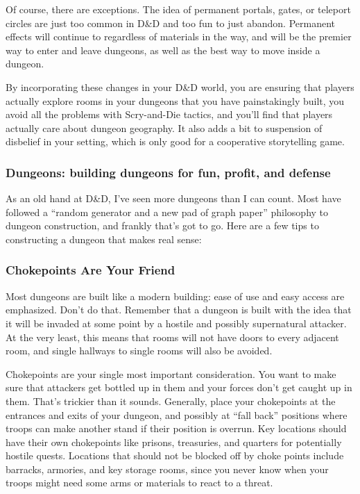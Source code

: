 Of course, there are exceptions. The idea of permanent portals, gates, or teleport circles are just too common in D\&D and too fun to just abandon. Permanent effects will continue to regardless of materials in the way, and will be the premier way to enter and leave dungeons, as well as the best way to move inside a dungeon.

By incorporating these changes in your D\&D world, you are ensuring that players actually explore rooms in your dungeons that you have painstakingly built, you avoid all the problems with Scry-and-Die tactics, and you'll find that players actually care about dungeon geography. It also adds a bit to suspension of disbelief in your setting, which is only good for a cooperative storytelling game.

\subsubsection{Dungeons: building dungeons for fun, profit, and defense}
As an old hand at D\&D, I've seen more dungeons than I can count. Most have followed a ``random generator and a new pad of graph paper'' philosophy to dungeon construction, and frankly that's got to go. Here are a few tips to constructing a dungeon that makes real sense:

\subsubsection{Chokepoints Are Your Friend}
Most dungeons are built like a modern building: ease of use and easy access are emphasized. Don't do that. Remember that a dungeon is built with the idea that it will be invaded at some point by a hostile and possibly supernatural attacker. At the very least, this means that rooms will not have doors to every adjacent room, and single hallways to single rooms will also be avoided.

Chokepoints are your single most important consideration. You want to make sure that attackers get bottled up in them and your forces don't get caught up in them. That's trickier than it sounds. Generally, place your chokepoints at the entrances and exits of your dungeon, and possibly at ``fall back'' positions where troops can make another stand if their position is overrun. Key locations should have their own chokepoints like prisons, treasuries, and quarters for potentially hostile quests. Locations that should not be blocked off by choke points include barracks, armories, and key storage rooms, since you never know when your troops might need some arms or materials to react to a threat.


